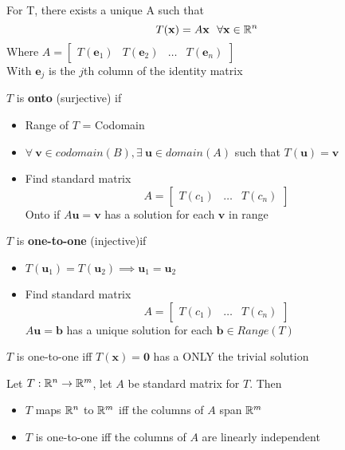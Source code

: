 \documentclass{report}
\begin{document}
\begin{theorem}
\end{theorem}
For T, there exists a unique A such that
\[
T(\mathbf{x}) = A \mathbf{x}\ \ \forall \mathbf{x} \in \mathbb{R}^n\\
\]
Where $A = \begin{bmatrix} T(\mathbf{e}_1) & T(\mathbf{e}_2) & \dots & T(\mathbf{e}_n) \end{bmatrix}$\\
With $\mathbf{e}_j$ is the $j$th column of the identity matrix


\begin{definition}
\end{definition}
$T$ is \textbf{onto} (surjective) if
\begin{itemize}
    \item Range of $T$ = Codomain
    \item $\forall \ \mathbf{v} \in codomain (B), \exists \ 
    \mathbf{u} \in domain (A)$ such that $T(\mathbf{u})=\mathbf{v}$
    \item Find standard matrix 
    \[
    A = \begin{bmatrix}
        T(c_1) & \ldots & T(c_n)
    \end{bmatrix}
    \]
    Onto if $A \mathbf{u} = \mathbf{v}$ has a solution for each $\mathbf{v}$ in range
\end{itemize}

\begin{definition}
\end{definition}
$T$ is \textbf{one-to-one} (injective)if
\begin{itemize}
    \item $T(\mathbf{u}_1) = T(\mathbf{u}_2) \implies \mathbf{u}_1 = \mathbf{u}_2$
    \item Find standard matrix 
    \[
    A = \begin{bmatrix}
        T(c_1) & \ldots & T(c_n)
    \end{bmatrix}
    \]
    $A \mathbf{u} = \mathbf{b}$ has a unique solution for each $\mathbf{b} \in Range(T)$
\end{itemize}

\begin{theorem}
    $T$ is one-to-one iff $T(\mathbf{x}) = \mathbf{0}$ has a ONLY the trivial solution
\end{theorem}

\begin{theorem}
    Let $T: \mathbb{R}^n \to \mathbb{R}^m$, let $A$ be standard matrix for $T$. Then 
    \begin{itemize}
        \item $T$ maps $\mathbb{R}^n$ to $\mathbb{R}^m$ iff the columns of $A$ span $\mathbb{R}^m$
        \item $T$ is one-to-one iff the columns of $A$ are linearly independent
    \end{itemize}
\end{theorem}
\end{document}

